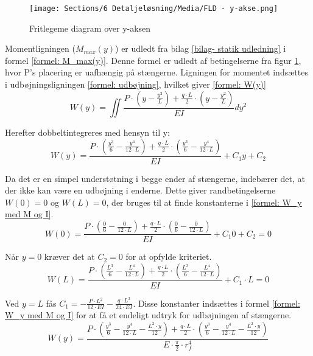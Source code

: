 \begin{figure}[H]
    \centering
    \texttt{[image: Sections/6 Detaljeløsning/Media/FLD - y-akse.png]}
    \caption{Fritlegeme diagram over y-aksen}
    \label{fig: FLD y-udbøj}
\end{figure}

Momentligningen ($M_{max}(y)$) er udledt fra bilag \ref{bilag- statik udledning} i formel \ref{formel: M_max(y)}. Denne formel er udledt af betingelserne fra figur \ref{fig: FLD y-udbøj}, hvor P's placering er uafhængig på stængerne. Ligningen for momentet indsættes i udbøjningsligningen \ref{formel: udbøjning}, hvilket giver \ref{formel: W(y)}
\begin{equation} \label{formel: W(y)}
    W(y)=\iint \frac{P\cdot \left(y-\frac{y^2}{L}\right)+\frac {q\cdot L}{2}\cdot\left( y-\frac{y^2}{L}\right)}{EI}dy^2
\end{equation}

Herefter dobbeltintegreres med hensyn til y:
\begin{equation} \label{formel: W_y med M og I}
   W(y)= \frac{P\cdot \left(\frac{y^3}{6}-\frac{y^4}{12\cdot L}\right)+\frac {q\cdot L}{2}\cdot\left(\frac{y^3}{6}-\frac{y^4}{12\cdot L}\right)}{EI} + C_1 y+C_2
\end{equation}

Da det er en simpel understøtning i begge ender af stængerne, indebærer det, at der ikke kan være en udbøjning i enderne. Dette giver randbetingelserne $W(0)=0$ og $W(L)=0$, der bruges til at finde konstanterne i \ref{formel: W_y med M og I}.
\begin{equation} \label{formel: W(0)}
        W(0)= \frac{P\cdot \left(\frac{0}{6}-\frac{0}{12\cdot L}\right)+\frac {q\cdot L}{2}\cdot\left(\frac{0}{6}-\frac{0}{12\cdot L}\right)}{EI} + C_1 0+C_2=0
\end{equation}

Når $y=0$ kræver det at $C_2=0$ for at opfylde kriteriet.
\begin{equation} \label{formel: W(L)}
       W(L)=\frac{P\cdot \left(\frac{L^3}{6}-\frac{L^4}{12\cdot L}\right)+\frac {q\cdot L}{2}\cdot\left(\frac{L^3}{6}-\frac{L^4}{12\cdot L}\right) }{EI} + C_1\cdot L=0
\end{equation} 

Ved $y=L$ fås $C_1=-\frac{P\cdot L^2}{12\cdot EI}-\frac{q\cdot L^3}{24\cdot EI}$. Disse konstanter indsættes i formel \ref{formel: W_y med M og I} for at få et endeligt udtryk for udbøjningen af stængerne.
\begin{equation} \label{formel: W(y) med C1 og C2}
   W(y)= \frac{P\cdot \left(\frac{y^3}{6}-\frac{y^4}{12\cdot L}-\frac{L^2\cdot y}{12}\right)+\frac {q\cdot L}{2}\cdot\left(\frac{y^3}{6}-\frac{y^4}{12\cdot L}-\frac{L^2\cdot y}{12}\right)}{E\cdot\frac{\pi}{2}\cdot r_f^4}
\end{equation}

